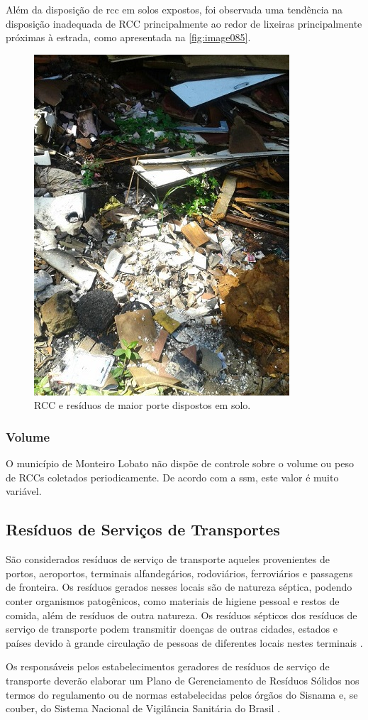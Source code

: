 Além da disposição de \gls{rcc} em solos expostos, foi observada uma tendência na disposição inadequada de RCC principalmente ao redor de lixeiras principalmente próximas à estrada, como apresentada na \autoref{fig:image085}.

\clearpage	
\begin{figure}
	\centering
	\includegraphics[width=0.4\linewidth]{produtos/prodtres/image085}
	\caption{RCC e resíduos de maior porte dispostos em solo.}
	\label{fig:image085}
\end{figure}


\subsubsection{Volume}
O município de Monteiro Lobato não dispõe de controle sobre o volume ou peso de RCCs coletados periodicamente. De acordo com a \gls{ssm}, este valor é muito variável.


\subsection{Resíduos de Serviços de Transportes}

São considerados resíduos de serviço de transporte aqueles provenientes de portos, aeroportos, terminais alfandegários, rodoviários, ferroviários e passagens de fronteira. Os resíduos gerados nesses locais são de natureza séptica, podendo conter organismos patogênicos, como materiais de higiene pessoal e restos de comida, além de resíduos de outra natureza. Os resíduos sépticos dos resíduos de serviço de transporte podem transmitir doenças de outras cidades, estados e países devido à grande circulação de pessoas de diferentes locais nestes terminais \cite{brasil:12305}.

Os responsáveis pelos estabelecimentos geradores de resíduos de serviço de transporte deverão elaborar um Plano de Gerenciamento de Resíduos Sólidos nos termos do regulamento ou de normas estabelecidas pelos órgãos do Sisnama e, se couber, do Sistema Nacional de Vigilância Sanitária do Brasil \cite{brasil:12305}.

